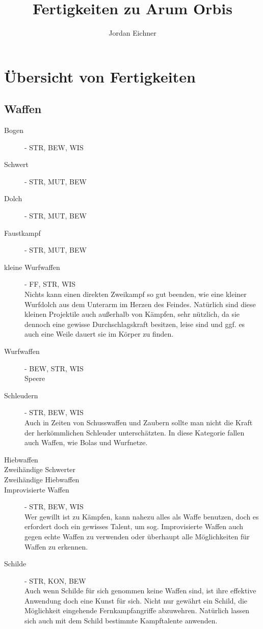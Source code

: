\documentclass[a4paper,12pt,oneside]{book}
\author{Jordan Eichner}
\title{Fertigkeiten zu Arum Orbis}
\date{}
\begin{document}
\maketitle
\tableofcontents
\section{Übersicht von Fertigkeiten}
\subsection{Waffen}
\begin{description}
\item[Bogen]- STR, BEW, WIS
\item[Schwert]- STR, MUT, BEW
\item[Dolch]- STR, MUT, BEW
\item[Faustkampf]- STR, MUT, BEW
\item[kleine Wurfwaffen]- FF, STR, WIS
\\Nichts kann einen direkten Zweikampf so gut beenden, wie eine kleiner Wurfdolch aus dem Unterarm im Herzen des Feindes. Natürlich sind diese kleinen Projektile auch außerhalb von Kämpfen, sehr nützlich, da sie dennoch eine gewisse Durchschlagskraft besitzen, leise sind und ggf. es auch eine Weile dauert sie im Körper zu finden.
\item[Wurfwaffen]- BEW, STR, WIS
\\Speere
\item[Schleudern]- STR, BEW, WIS
\\Auch in Zeiten von Schusswaffen und Zaubern sollte man nicht die Kraft der herkömmlichen Schleuder unterschätzten. In diese Kategorie fallen auch Waffen, wie Bolas und Wurfnetze.
\item[Hiebwaffen]
\item[Zweihändige Schwerter]
\item[Zweihändige Hiebwaffen]
\item[Improvisierte Waffen] - STR, BEW, WIS
\\Wer gewillt ist zu Kämpfen, kann nahezu alles als Waffe benutzen, doch es erfordert doch ein gewisses Talent, um sog. Improvisierte Waffen auch gegen echte Waffen zu verwenden oder überhaupt alle Möglichkeiten für Waffen zu erkennen.
\item[Schilde] - STR, KON, BEW
\\Auch wenn Schilde für sich genommen keine Waffen sind, ist ihre effektive Anwendung doch eine Kunst für sich. Nicht nur gewährt ein Schild, die Möglichkeit eingehende Fernkampfangriffe abzuwehren. Natürlich lassen sich auch mit dem Schild bestimmte Kampftalente anwenden.

\end{description}
\end{document}
